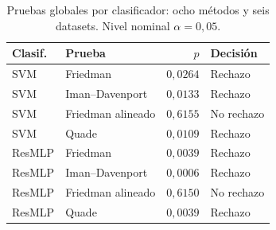 \begin{table}[H]
\centering\fontsize{8}{10}\selectfont\setlength{\tabcolsep}{3.0pt}
\caption{Pruebas globales por clasificador: ocho métodos y seis datasets. Nivel nominal $\alpha=0{,}05$.}
\label{tab:sel-metodos-global}
\begin{tabular}{@{}llrl@{}}
\toprule
Clasif. & Prueba & $p$ & Decisión \\
\midrule
SVM & Friedman & $0{,}0264$ & Rechazo \\
SVM & Iman--Davenport & $0{,}0133$ & Rechazo \\
SVM & Friedman alineado & $0{,}6155$ & No rechazo \\
SVM & Quade & $0{,}0109$ & Rechazo \\
ResMLP & Friedman & $0{,}0039$ & Rechazo \\
ResMLP & Iman--Davenport & $0{,}0006$ & Rechazo \\
ResMLP & Friedman alineado & $0{,}6150$ & No rechazo \\
ResMLP & Quade & $0{,}0039$ & Rechazo \\
\bottomrule
\end{tabular}
\end{table}
